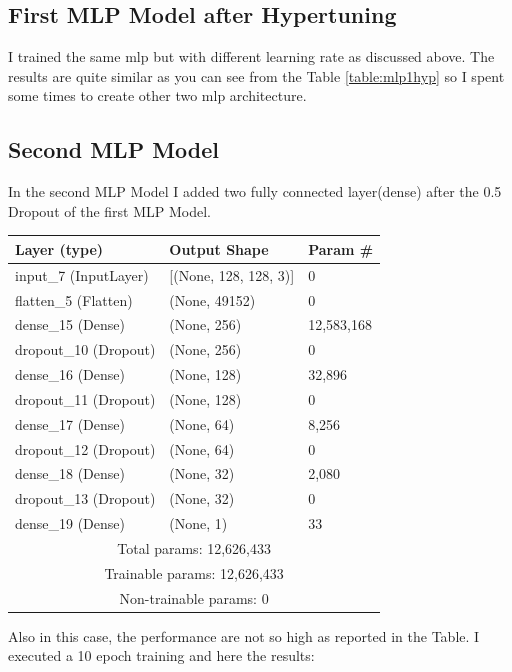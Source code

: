 \subsection{First MLP Model after Hypertuning}
I trained the same mlp but with different learning rate as discussed above.
The results are quite similar as you can see from the Table \ref{table:mlp1hyp} so I spent some times to create other two mlp architecture.
\subsection{Second MLP Model}
In the second MLP Model I added two fully connected layer(dense) after the 0.5 Dropout of the first MLP Model.
\begin{center}
\begin{tabular}{|l|l|l|}
\hline
\textbf{Layer (type)} & \textbf{Output Shape} & \textbf{Param \#} \\
\hline
input\_7 (InputLayer) & [(None, 128, 128, 3)] & 0 \\
\hline
flatten\_5 (Flatten) & (None, 49152) & 0 \\
\hline
dense\_15 (Dense) & (None, 256) & 12,583,168 \\
\hline
dropout\_10 (Dropout) & (None, 256) & 0 \\
\hline
dense\_16 (Dense) & (None, 128) & 32,896 \\
\hline
dropout\_11 (Dropout) & (None, 128) & 0 \\
\hline
dense\_17 (Dense) & (None, 64) & 8,256 \\
\hline
dropout\_12 (Dropout) & (None, 64) & 0 \\
\hline
dense\_18 (Dense) & (None, 32) & 2,080 \\
\hline
dropout\_13 (Dropout) & (None, 32) & 0 \\
\hline
dense\_19 (Dense) & (None, 1) & 33 \\
\hline
\multicolumn{3}{|c|}{Total params: 12,626,433} \\
\hline
\multicolumn{3}{|c|}{Trainable params: 12,626,433} \\
\hline
\multicolumn{3}{|c|}{Non-trainable params: 0} \\
\hline
\end{tabular}
\end{center}
Also in this case, the performance are not so high as reported in the Table. I executed a 10 epoch training and here the results:
